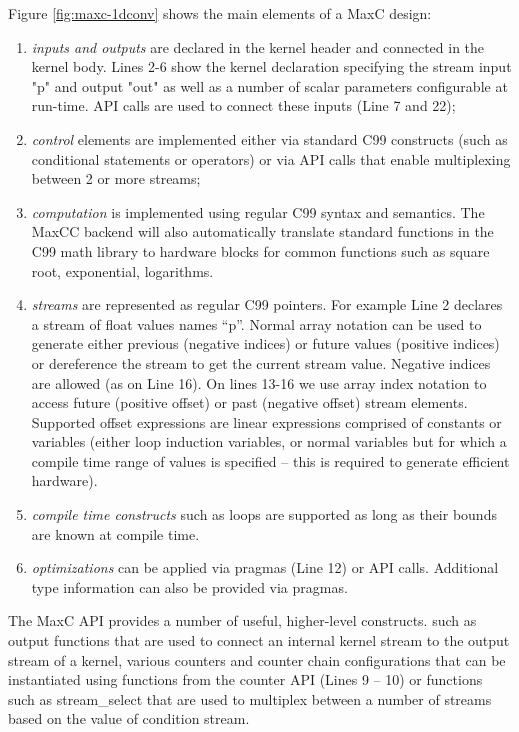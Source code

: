 Figure \ref{fig:maxc-1dconv} shows the main elements of a MaxC design:

\begin{enumerate}
\item \emph{inputs and outputs} are declared in the kernel header and
  connected in the kernel body. Lines 2-6 show the kernel declaration
  specifying the stream input "p" and output "out" as well as a number
  of scalar parameters configurable at run-time. API calls are used to
  connect these inputs (Line 7 and 22);

\item \emph{control} elements are implemented either via standard C99
  constructs (such as conditional statements or operators) or via API
  calls that enable multiplexing between 2 or more streams;

\item \emph{computation} is implemented using regular C99 syntax and
  semantics. The MaxCC backend will also automatically translate
  standard functions in the C99 math library to hardware blocks for
  common functions such as square root, exponential, logarithms.

\item \emph{streams} are represented as regular C99 pointers. For
  example Line 2 declares a stream of float values names ``p''.
  Normal array notation can be used to generate either previous
  (negative indices) or future values (positive indices) or
  dereference the stream to get the current stream value. Negative
  indices are allowed (as on Line 16). On lines 13-16 we use array
  index notation to access future (positive offset) or past (negative
  offset) stream elements. Supported offset expressions are linear
  expressions comprised of constants or variables (either loop
  induction variables, or normal variables but for which a compile
  time range of values is specified -- this is required to generate
  efficient hardware).

\item \emph{compile time constructs} such as loops are supported as
  long as their bounds are known at compile time.

\item \emph{optimizations} can be applied via pragmas (Line 12) or API
  calls. Additional type information can also be provided via pragmas.

\end{enumerate}

The MaxC API provides a number of useful, higher-level constructs.
such as output functions that are used to connect an internal kernel
stream to the output stream of a kernel, various counters and counter
chain configurations that can be instantiated using functions from the
counter API (Lines 9 -- 10) or functions such as stream\_select that
are used to multiplex between a number of streams based on the value
of condition stream.


